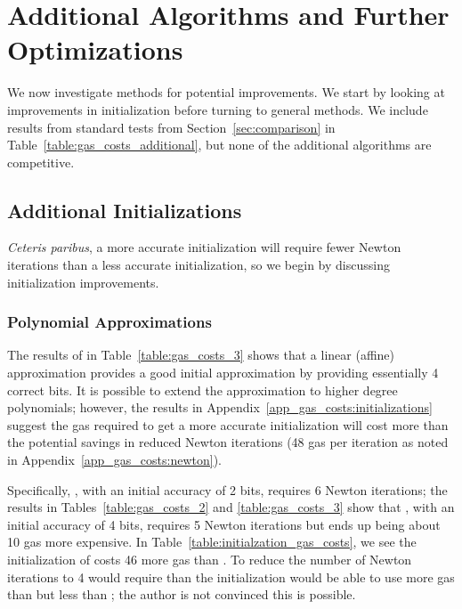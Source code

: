\section{Additional Algorithms and Further Optimizations}
\label{app:algs_optimizations}

We now investigate methods for potential improvements.
We start by looking at improvements in initialization
before turning to general methods.
We include results from standard tests from Section~\ref{sec:comparison}
in Table~\ref{table:gas_costs_additional},
but none of the additional algorithms are competitive.




\subsection{Additional Initializations}
\label{app:algs_opt_init}

\emph{Ceteris paribus},
a more accurate initialization will require fewer Newton iterations
than a less accurate initialization,
so we begin by discussing initialization improvements.

\subsubsection{Polynomial Approximations}
\label{app:algs_opt_polynomial}

The results of \Linear{} in Table~\ref{table:gas_costs_3}
shows that a linear (affine) approximation provides
a good initial approximation
by providing essentially 4 correct bits.
It is possible to extend the approximation
to higher degree polynomials;
however, the results in Appendix~\ref{app_gas_costs:initializations}
suggest the gas required to get a more accurate initialization
will cost more than the potential savings in reduced Newton iterations
(48 gas per iteration as noted in Appendix~\ref{app_gas_costs:newton}).

Specifically, \UnrolledThree{}, with an initial accuracy of 2 bits,
requires 6 Newton iterations;
the results in Tables~\ref{table:gas_costs_2} and \ref{table:gas_costs_3}
show that \Linear{}, with an initial accuracy of 4 bits,
requires 5 Newton iterations but ends up being about 10 gas more expensive.
In Table~\ref{table:initialzation_gas_costs},
we see the initialization of \HyperFour{} costs 46 more gas than \Linear{}.
To reduce the number of Newton iterations to 4
would require than the initialization would be able to use
more gas than \Linear{} but less than \HyperFour{};
the author is not convinced this is possible.

